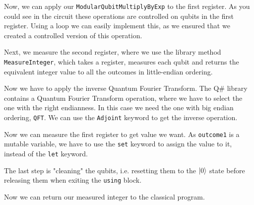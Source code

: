 

Now, we can apply our \texttt{ModularQubitMultiplyByExp} to the first register. As you could see in the circuit these operations are controlled on qubits in the first register. Using a loop we can easily implement this, as we ensured that we created a controlled version of this operation. %



Next, we measure the second register, where we use the library method \texttt{MeasureInteger}, which takes a register, measures each qubit and returns the equivalent integer value to all the outcomes in little-endian ordering.



Now we have to apply the inverse Quantum Fourier Transform. The Q\# library contains a Quantum Fourier Transform operation, where we have to select the one with the right endianness. In this case we need the one with big endian ordering, \texttt{QFT}. We can use the \texttt{Adjoint} keyword to get the inverse operation. 



Now we can measure the first register to get value we want. As \texttt{outcome1} is a mutable variable, we have to use the \texttt{set} keyword to assign the value to it, instead of the \texttt{let} keyword.



The last step is "cleaning" the qubits, i.e. resetting them to the $\left\vert{0}\right\rangle$ state before releasing them when exiting the \texttt{using} block.



Now we can return our measured integer to the classical program.


